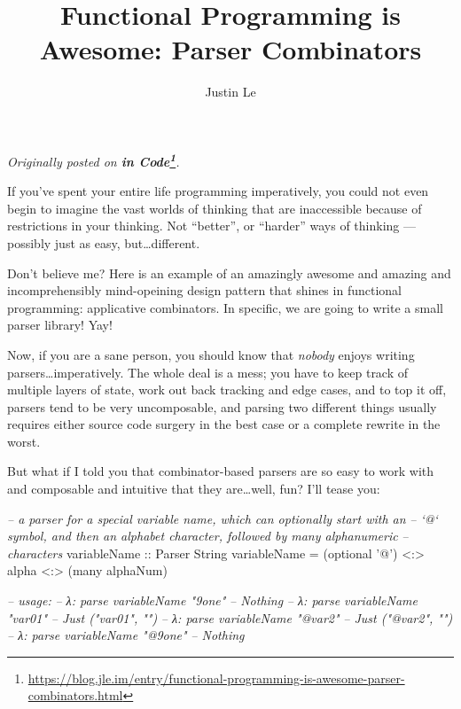 \documentclass[]{article}
\title{Functional Programming is Awesome: Parser Combinators}
\author{Justin Le}
\newenvironment{Shaded}{}{}
\newcommand{\DataTypeTok}[1]{\textcolor[rgb]{0.56,0.13,0.00}{{#1}}}
\newcommand{\CharTok}[1]{\textcolor[rgb]{0.25,0.44,0.63}{{#1}}}
\newcommand{\CommentTok}[1]{\textcolor[rgb]{0.38,0.63,0.69}{\textit{{#1}}}}
\newcommand{\OtherTok}[1]{\textcolor[rgb]{0.00,0.44,0.13}{{#1}}}
\newcommand{\FunctionTok}[1]{\textcolor[rgb]{0.02,0.16,0.49}{{#1}}}
\newcommand{\NormalTok}[1]{{#1}}
\renewcommand{\href}[2]{#2\footnote{\url{#1}}}
\begin{document}
\maketitle

\emph{Originally posted on
\textbf{\href{https://blog.jle.im/entry/functional-programming-is-awesome-parser-combinators.html}{in
Code}}.}

If you've spent your entire life programming imperatively, you could not even
begin to imagine the vast worlds of thinking that are inaccessible because of
restrictions in your thinking. Not ``better'', or ``harder'' ways of thinking
--- possibly just as easy, but\ldots{}different.

Don't believe me? Here is an example of an amazingly awesome and amazing and
incomprehensibly mind-opeining design pattern that shines in functional
programming: applicative combinators. In specific, we are going to write a small
parser library! Yay!

Now, if you are a sane person, you should know that \emph{nobody} enjoys writing
parsers\ldots{}imperatively. The whole deal is a mess; you have to keep track of
multiple layers of state, work out back tracking and edge cases, and to top it
off, parsers tend to be very uncomposable, and parsing two different things
usually requires either source code surgery in the best case or a complete
rewrite in the worst.

But what if I told you that combinator-based parsers are so easy to work with
and composable and intuitive that they are\ldots{}well, fun? I'll tease you:

\begin{Shaded}
\begin{Highlighting}[]
\CommentTok{-- a parser for a special variable name, which can optionally start with an}
\CommentTok{-- `@` symbol, and then an alphabet character, followed by many alphanumeric}
\CommentTok{-- characters}
\OtherTok{variableName ::} \DataTypeTok{Parser} \DataTypeTok{String}
\NormalTok{variableName }\FunctionTok{=} \NormalTok{(optional }\CharTok{'@'}\NormalTok{) }\FunctionTok{<:>} \NormalTok{alpha }\FunctionTok{<:>} \NormalTok{(many alphaNum)}

\CommentTok{-- usage:}
\CommentTok{-- λ: parse variableName "9one"}
\CommentTok{-- Nothing}
\CommentTok{-- λ: parse variableName "var01"}
\CommentTok{-- Just ("var01", "")}
\CommentTok{-- λ: parse variableName "@var2"}
\CommentTok{-- Just ("@var2", "")}
\CommentTok{-- λ: parse variableName "@9one"}
\CommentTok{-- Nothing}
\end{Highlighting}
\end{Shaded}
\end{document}

